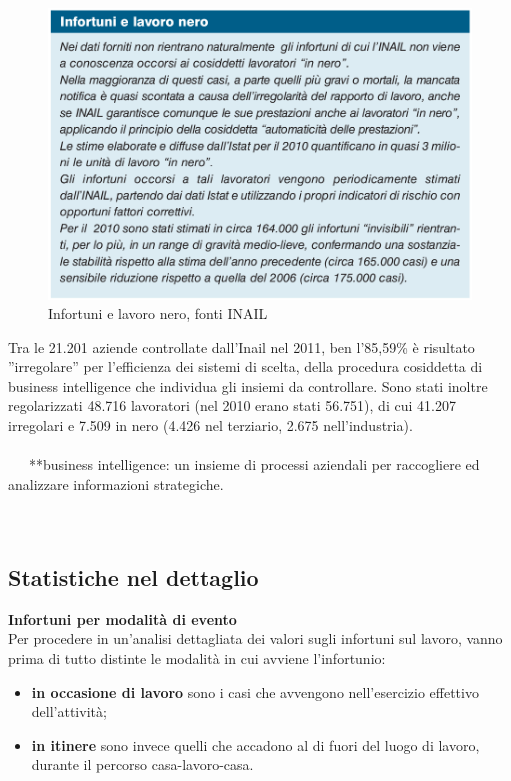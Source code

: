 \begin{figure}[H]
\centering
\includegraphics[scale=0.4]{images/cap4/analisiDiMercato/infortuniLavoroNero}
\caption{Infortuni e lavoro nero, fonti INAIL}
\end{figure}

Tra le 21.201 aziende controllate dall'Inail nel 2011, ben l'85,59\% è risultato ''irregolare'' per l'efficienza dei sistemi di scelta, della procedura cosiddetta di business intelligence che individua gli insiemi da controllare. Sono stati inoltre regolarizzati 48.716 lavoratori (nel 2010 erano stati 56.751), di cui 41.207 irregolari e 7.509 in nero (4.426 nel terziario, 2.675 nell'industria).\\\\



\
\
\
**business intelligence: un insieme di processi aziendali per raccogliere ed analizzare informazioni strategiche.\\\\

\ \
\subsection{Statistiche nel dettaglio}

\textbf{Infortuni per modalità di evento}\\
Per procedere in un'analisi dettagliata dei valori sugli infortuni sul lavoro, vanno prima di tutto distinte le modalità in cui avviene l'infortunio:

\begin{itemize}
\item \textbf{in occasione di lavoro} sono i casi che avvengono nell'esercizio effettivo dell'attività;
\item \textbf{in itinere} sono invece quelli che accadono al di fuori del luogo di lavoro, durante il percorso casa-lavoro-casa.
\end{itemize}


